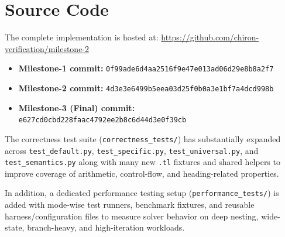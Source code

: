 
\section*{Source Code}

The complete implementation is hosted at:
\url{https://github.com/chiron-verification/milestone-2}

\begin{itemize}[leftmargin=1.5em]
	\item \textbf{Milestone-1 commit:}
	\texttt{0f99ade6d4aa2516f9e47e013ad06d29e8b8a2f7}
	\item \textbf{Milestone-2 commit:}
	\texttt{4d3e3e6499b5eea03d25f0b0a3e1bf7a4dcd998b}
	\item \textbf{Milestone-3 (Final) commit:}
	\texttt{e627cd0cbd228faac4792ee2b8c6d44d3e0f39cb}
\end{itemize}

\noindent
The correctness test suite (\texttt{correctness\_tests/}) has substantially expanded across
\texttt{test\_default.py}, \texttt{test\_specific.py},
\texttt{test\_universal.py}, and \texttt{test\_semantics.py} along with many new \texttt{.tl} fixtures and shared
helpers to improve coverage of arithmetic, control-flow, and heading-related
properties.

In addition, a dedicated performance testing setup (\texttt{performance\_tests/}) is added with mode-wise test
runners, benchmark fixtures, and reusable harness/configuration files to measure
solver behavior on deep nesting, wide-state, branch-heavy, and high-iteration
workloads.
